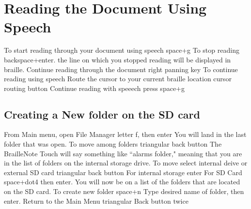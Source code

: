 \documentclass[10pt,letterpaper,twoside]{report}
\begin{document}
{{{%
\clearpage
\section{Reading the Document Using Speech}

To start reading through your document using speech \dotfill space+g
To stop reading \dotfill backspace+enter. 
	the line on which you stopped reading will be displayed in braille.
	Continue reading through the document \dotfill right panning key
To continue reading using speech
	Route the cursor to your current braille location \dotfill cursor routing button
	Continue reading with speeech \dotfill  press space+g 
\clearpage
\subsection{Creating a New folder on the SD card}
From Main menu, open File Manager \dotfill letter f, then enter
	You will land in the last folder that was open.
To move among folders \dotfill triangular back button
	The BrailleNote Touch will say something like ``alarms folder," meaning that you are in the list of folders on the internal storage drive.
To move select internal deive or external SD card \dotfill triangular back button
	For internal storage \dotfill enter
	For SD Card \dotfill space+dot4 then enter. 
		You will now be on a list of the folders that are located on the SD card.
To create new folder \dotfill space+n
	Type desired name of folder, then enter.
Return to the Main Menu \dotfill triangular Back button twice
\clearpage
}}}
\end{document}

